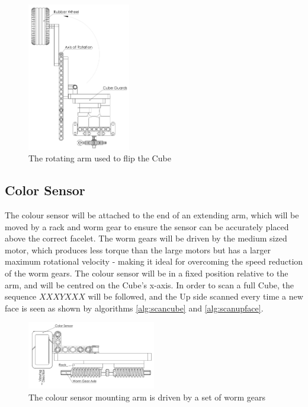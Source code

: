 \documentclass{report}
\begin{document}
    \begin{figure}[h!]
    	\begin{center}
    		\includegraphics[width=0.4\textwidth]{Resources/Images/dwgRotatingArm.png}
    		\caption{The rotating arm used to flip the Cube}
    		\label{fig:dwgRotatingArm}
    	\end{center}
    \end{figure}
    
    
    \subsection{Color Sensor}
    The colour sensor will be attached to the end of an extending arm, which will be moved by a rack and worm gear to ensure the sensor can be accurately placed above the correct facelet. The worm gears will be driven by the medium sized motor, which produces less torque than the large motors but has a larger maximum rotational velocity - making it ideal for overcoming the speed reduction of the worm gears. The colour sensor will be in a fixed position relative to the arm, and will be centred on the Cube's x-axis. In order to scan a full Cube, the sequence $X X X Y X X X$ will be followed, and the Up side scanned every time a new face is seen as shown by algorithms \ref{alg:scancube} and \ref{alg:scanupface}.
    
    \begin{figure}[h!]
    	\begin{center}
    		\includegraphics[width=0.5\textwidth]{Resources/Images/dwgColorSensor.png}
    		\caption{The colour sensor mounting arm is driven by a set of worm gears}
    		\label{fig:dwgColorSensor}
    	\end{center}
    \end{figure}
    
\end{document}
